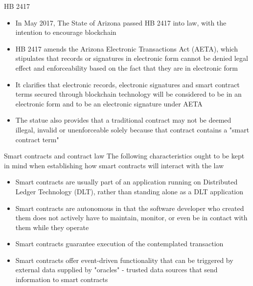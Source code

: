 \documentclass[10pt]{beamer}
\begin{document}


\begin{frame}{HB 2417}
	\begin{itemize}
		\item In May 2017, The State of Arizona passed HB 2417 into law, with the intention to encourage blockchain
		\item HB 2417 amends the Arizona Electronic Transactions Act (AETA), which stipulates that records or signatures in electronic form cannot be denied legal effect and enforceability based on the fact that they are in electronic form
		\item It clarifies that electronic records, electronic signatures and smart contract terms secured through blockchain technology will be considered to be in an electronic form and to be an electronic signature under AETA
		\item The statue also provides that a traditional contract may not be deemed illegal, invalid or unenforceable solely because that contract contains a "smart contract term"
	\end{itemize}
\end{frame}



\begin{frame}{Smart contracts and contract law}
	The following characteristics ought to be kept in mind when establishing how smart contracts will interact with the law
	\begin{itemize}
		\item Smart contracts are usually part of an application running on Distributed Ledger Technology (DLT), rather than standing alone as a DLT application
		\item Smart contracts are autonomous in that the software developer who created them does not actively have to maintain, monitor, or even be in contact with them while they operate
		\item Smart contracts guarantee execution of the contemplated transaction
		\item Smart contracts offer event-driven functionality that can be triggered by external data  supplied by "oracles" - trusted data sources that send information to smart contracts
	\end{itemize}
\end{frame}
\end{document}
